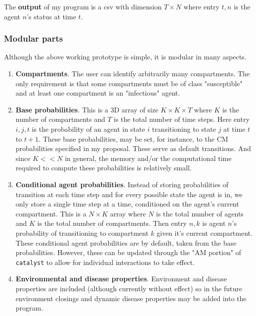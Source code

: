 \documentclass{article}
\begin{document}
The \textbf{output} of my program is a csv with dimension $T \times N$ where entry $t,n$ is the agent $n$'s status at time $t$.

\subsubsection{Modular parts}
\label{sec-2-3-1}
Although the above working prototype is simple, it is modular in many aspects.

\begin{enumerate}
\item \textbf{Compartments}.  The user can identify arbitrarily many compartments.  The only requirement is that some compartments must be of class "susceptible" and at least one compartment is an "infectious" agent.

\item \textbf{Base probabilities}.  This is a 3D array of size $K\times K \times T$ where $K$ is the number of compartments and $T$ is the total number of time steps.  Here entry $i,j,t$ is the probability of an agent in state $i$ transitioning to state $j$ at time $t$ to $t+1$.  These base probabilities, may be set, for instance, to the CM probabilities specified in my proposal.  These serve as default transitions.  And since $K << N$ in general, the memory and/or the computational time required to compute these probabilities is relatively small.

\item \textbf{Conditional agent probabilities}.  Instead of storing probabilities of transition at each time step and for every possible state the agent is in, we only store a single time step at a time, conditioned on the agent's current compartment.  This is a $N \times K$ array where $N$ is the total number of agents and $K$ is the total number of compartments.  Then entry $n,k$ is agent $n$'s probability of transitioning to compartment $k$ given it's current compartment.  These conditional agent probabilities are by default, taken from the base probabilities.  However, these can be updated through the "AM portion" of \texttt{catalyst} to allow for individual interactions to take effect.

\item \textbf{Environmental and disease properties}.  Environment and disease properties are included (although currently without effect) so in the future environment closings and dynamic disease properties may be added into the program.
\end{enumerate}
\end{document}
